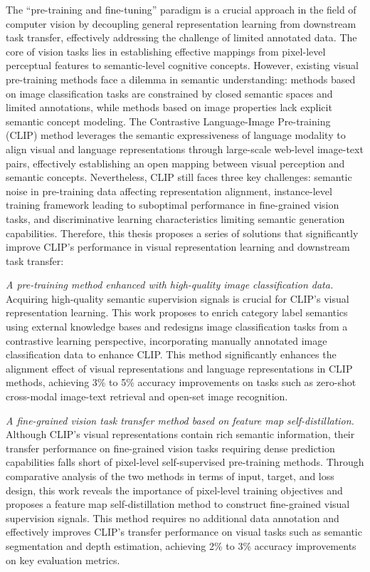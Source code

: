\begin{abstract*}
The ``pre-training and fine-tuning'' paradigm is a crucial approach in the field of computer vision by decoupling general representation learning from downstream task transfer, effectively addressing the challenge of limited annotated data. The core of vision tasks lies in establishing effective mappings from pixel-level perceptual features to semantic-level cognitive concepts. However, existing visual pre-training methods face a dilemma in semantic understanding: methods based on image classification tasks are constrained by closed semantic spaces and limited annotations, while methods based on image properties lack explicit semantic concept modeling. The Contrastive Language-Image Pre-training (CLIP) method leverages the semantic expressiveness of language modality to align visual and language representations through large-scale web-level image-text pairs, effectively establishing an open mapping between visual perception and semantic concepts. Nevertheless, CLIP still faces three key challenges: semantic noise in pre-training data affecting representation alignment, instance-level training framework leading to suboptimal performance in fine-grained vision tasks, and discriminative learning characteristics limiting semantic generation capabilities. Therefore, this thesis proposes a series of solutions that significantly improve CLIP's performance in visual representation learning and downstream task transfer:  

\textit{A pre-training method enhanced with high-quality image classification data.} Acquiring high-quality semantic supervision signals is crucial for CLIP's visual representation learning. This work proposes to enrich category label semantics using external knowledge bases and redesigns image classification tasks from a contrastive learning perspective, incorporating manually annotated image classification data to enhance CLIP. This method significantly enhances the alignment effect of visual representations and language representations in CLIP methods, achieving 3\% to 5\% accuracy improvements on tasks such as zero-shot cross-modal image-text retrieval and open-set image recognition.

\textit{A fine-grained vision task transfer method based on feature map self-distillation.} Although CLIP's visual representations contain rich semantic information, their transfer performance on fine-grained vision tasks requiring dense prediction capabilities falls short of pixel-level self-supervised pre-training methods. Through comparative analysis of the two methods in terms of input, target, and loss design, this work reveals the importance of pixel-level training objectives and proposes a feature map self-distillation method to construct fine-grained visual supervision signals. This method requires no additional data annotation and effectively improves CLIP's transfer performance on visual tasks such as semantic segmentation and depth estimation, achieving 2\% to 3\% accuracy improvements on key evaluation metrics.


\end{abstract*}
